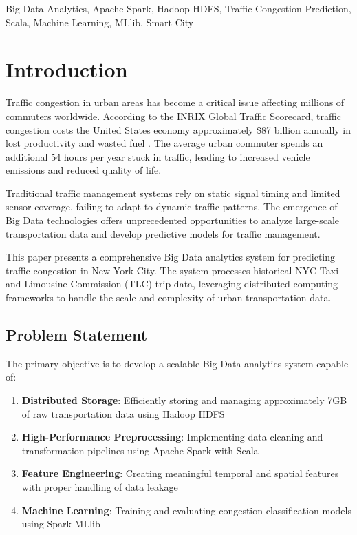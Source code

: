 \documentclass[conference]{IEEEtran}
\begin{document}
\begin{IEEEkeywords}
Big Data Analytics, Apache Spark, Hadoop HDFS, Traffic Congestion Prediction, Scala, Machine Learning, MLlib, Smart City
\end{IEEEkeywords}

\section{Introduction}

Traffic congestion in urban areas has become a critical issue affecting millions of commuters worldwide. According to the INRIX Global Traffic Scorecard, traffic congestion costs the United States economy approximately \$87 billion annually in lost productivity and wasted fuel \cite{inrix2023}. The average urban commuter spends an additional 54 hours per year stuck in traffic, leading to increased vehicle emissions and reduced quality of life.

Traditional traffic management systems rely on static signal timing and limited sensor coverage, failing to adapt to dynamic traffic patterns. The emergence of Big Data technologies offers unprecedented opportunities to analyze large-scale transportation data and develop predictive models for traffic management.

This paper presents a comprehensive Big Data analytics system for predicting traffic congestion in New York City. The system processes historical NYC Taxi and Limousine Commission (TLC) trip data, leveraging distributed computing frameworks to handle the scale and complexity of urban transportation data.

\subsection{Problem Statement}

The primary objective is to develop a scalable Big Data analytics system capable of:

\begin{enumerate}
    \item \textbf{Distributed Storage}: Efficiently storing and managing approximately 7GB of raw transportation data using Hadoop HDFS
    \item \textbf{High-Performance Preprocessing}: Implementing data cleaning and transformation pipelines using Apache Spark with Scala
    \item \textbf{Feature Engineering}: Creating meaningful temporal and spatial features with proper handling of data leakage
    \item \textbf{Machine Learning}: Training and evaluating congestion classification models using Spark MLlib
\end{enumerate}
\end{document}
